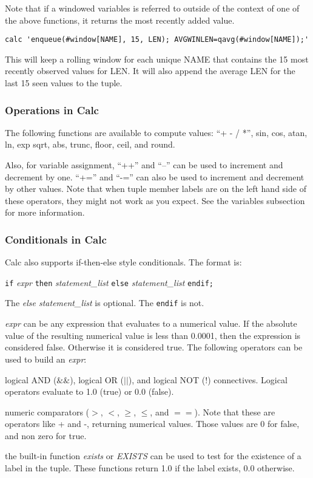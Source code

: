 \documentclass[11pt]{article}
\begin{document}
Note that if a windowed variables is referred to outside of the context of one of the above functions,
it returns the most recently added value.

\begin{lstlisting}
calc 'enqueue(#window[NAME], 15, LEN); AVGWINLEN=qavg(#window[NAME]);'
\end{lstlisting}

This will keep a rolling window for each unique NAME that contains the 15 most recently observed
values for LEN.  It will also append the average LEN for the last 15 seen values to the tuple.

\subsubsection {Operations in Calc}

The following functions are available to compute values: ``+ - / *'', sin, cos, atan, ln, exp
sqrt, abs, trunc, floor, ceil, and round.

Also, for variable assignment, ``++'' and ``--'' can be used to increment and decrement by one.
``+='' and ``-='' can also be used to increment and decrement  by other values.  Note that
when tuple member labels are on the left hand side of these operators, they might not work 
as you expect.  See the variables subsection for more information.

\subsubsection {Conditionals in Calc}

Calc also supports if-then-else style conditionals.  The format is:

\texttt{if} \textit{expr} \texttt{then} \textit{statement\_list} \texttt{else}
\textit{statement\_list} \texttt{endif;}

The \textit{else statement\_list} is optional.  The \texttt{endif} is not.

\textit{expr} can be any expression that evaluates to a numerical value.  If the absolute value of
the resulting numerical value is less than 0.0001, then the expression is considered false.
Otherwise it is considered true.
The following operators can be used to build an \textit{expr}:
\begin{itemize*}
\item logical AND (\texttt{$\&\&$}), logical OR (\texttt{$||$}), and logical NOT (\texttt{$!$})
connectives.  Logical
operators evaluate to 1.0 (true) or 0.0 (false).
\item numeric comparators ($>$, $<$, $\ge$, $\le$, and $==$).  Note that these are operators like
+ and -, returning numerical values.  Those values are 0 for false, and non zero for true.
\item the built-in function \textit{exists} or \textit{EXISTS} can be used to test for the existence
of a label in the tuple.  These functions return 1.0 if the label exists, 0.0 otherwise.
\end{itemize*}
\end{document}
